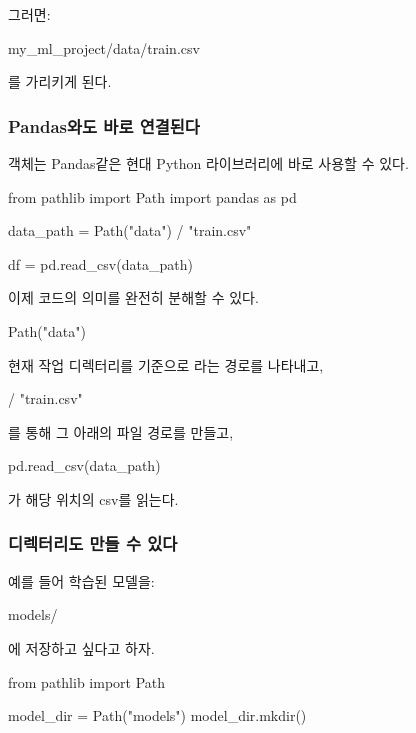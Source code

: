 그러면:

\begin{dhkzsh}
my_ml_project/data/train.csv
\end{dhkzsh}

를 가리키게 된다.

\subsubsection{Pandas와도 바로 연결된다}

객체는 Pandas같은 현대 Python 라이브러리에 바로 사용할 수 있다.

\begin{dhkcode}
from pathlib import Path
import pandas as pd

data_path = Path("data") / "train.csv"

df = pd.read_csv(data_path)
\end{dhkcode}

이제 코드의 의미를 완전히 분해할 수 있다.

\begin{dhkcode}
Path("data")
\end{dhkcode}

현재 작업 디렉터리를 기준으로 라는 경로를 나타내고,

\begin{dhkcode}
/ "train.csv"
\end{dhkcode}

를 통해 그 아래의 파일 경로를 만들고,

\begin{dhkcode}
pd.read_csv(data_path)
\end{dhkcode}

가 해당 위치의 csv를 읽는다.

\subsubsection{디렉터리도 만들 수 있다}

예를 들어 학습된 모델을:

\begin{dhkzsh}
models/
\end{dhkzsh}

에 저장하고 싶다고 하자.

\begin{dhkcode}
from pathlib import Path

model_dir = Path("models")
model_dir.mkdir()
\end{dhkcode}


